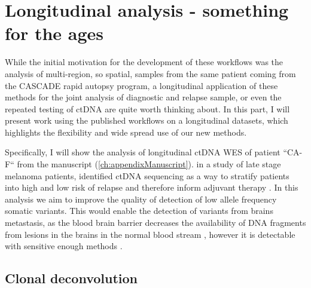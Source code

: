 \section[Longitudinal analysis]{Longitudinal analysis - something for the ages }
\label{variantcalling-sec:longitudinal}

While the initial motivation for the development of these workflows was the analysis of multi-region, so spatial, samples from the same patient coming from the CASCADE rapid autopsy program, a longitudinal application of these methods for the joint analysis of diagnostic and relapse sample, or even the repeated testing of ctDNA are quite worth thinking about. In this part, I will present work using the published workflows on a longitudinal datasets, which highlights the flexibility and wide spread use of our new methods.

Specifically, I will show the analysis of longitudinal ctDNA WES of patient ``CA-F`` from the manuscript (\autoref{ch:appendixManuscript}). in a study of late stage melanoma patients,  identified ctDNA sequencing as a way to stratify patients into high and low risk of relapse and therefore inform adjuvant therapy \cite{Tan2019}. In this analysis we aim to improve the quality of detection of low allele frequency somatic variants. This would enable the detection of variants from brains metastasis, as the blood brain barrier decreases the availability of DNA fragments from lesions in the brains in the normal blood stream \cite{2014}, however it is detectable with sensitive enough methods \cite{Yoon2019,Ma2020}.


\subsection[Clonal deconvolution]{Clonal deconvolution}
\label{variantcalling-sec:clonal}

